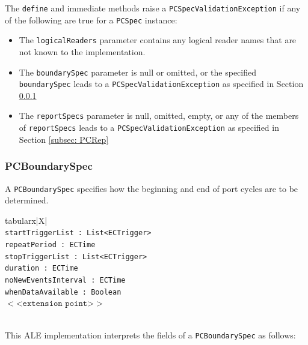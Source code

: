 \documentclass[11pt,a4paper,oneside]{article}
\newenvironment{bbox}%
{\begin{table}[h!]\begin{threeparttable}}%
{\end{threeparttable}\end{table}\FloatBarrier}
\newenvironment{bbox}
{\ifvmode\IgnorePar\fi \EndP\Tg<div class='bbox'>}{\Tg</div>\IgnoreIndent}
\begin{document}
The \texttt{define} and immediate methods raise a \texttt{PCSpecValidationException} if any of the following are true for a \texttt{PCSpec} instance:

\begin{itemize}
\item	The \texttt{logicalReaders} parameter contains any logical reader names that are not known to the implementation.
\item	The \texttt{boundarySpec} parameter is null or omitted, or the specified\ifpdf\\\fi \texttt{boundarySpec} leads to a \texttt{PCSpecValidationException} as specified in Section \ref{subsec:PCBound}
\item	The \texttt{reportSpecs} parameter is null, omitted, empty, or any of the members of \texttt{reportSpecs} leads to a \texttt{PCSpecValidationException} as specified in Section \ref{subsec: PCRep}
\end{itemize}

\subsubsection{PCBoundarySpec}
\label{subsec:PCBound}
A \texttt{PCBoundarySpec} specifies how the beginning and end of port cycles are to be determined.

\begin{bbox}
\begin{edtable}{tabularx}{\linewidth}{|X|}
\hline 
{}
\\
\texttt{startTriggerList : List<ECTrigger>  }\\
\texttt{repeatPeriod : ECTime}\\
\texttt{stopTriggerList : List<ECTrigger>}\\
\texttt{duration : ECTime}\\
\texttt{noNewEventsInterval : ECTime}\\
\texttt{whenDataAvailable : Boolean}\\
$<$<$\texttt{extension point}$>$>$\\
\texttt{\textendash \textendash \textendash}\\
\hline
\end{edtable}
\end{bbox}

This ALE implementation interprets the fields of a \texttt{PCBoundarySpec} as follows:
\end{document}
